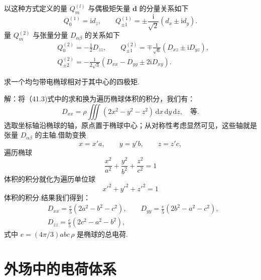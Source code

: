 以这种方式定义的量 $Q_m^{(l)}$ 与偶极矩矢量 $\boldsymbol{d}$ 的分量关系如下
\begin{equation}
  Q_0^{(1)}=\mathrm{i}d_z,\qquad
  Q_{\pm1}^{(1)}=\pm\frac{\mathrm{i}}{\sqrt{2}}(d_x\pm\mathrm{i}d_y).
\end{equation}
量 $Q_m^{(2)}$ 与张量分量 $D_{\alpha\beta}$ 的关系如下
\begin{equation}
\begin{aligned}
  &Q_0^{(2)}=-\frac{1}{2}D_{zz},\qquad
  Q_{\pm1}^{(2)}=\mp\frac{1}{\sqrt{6}}(D_{xz}\pm\mathrm{i}D_{yz}),\\
  &Q_{\pm2}^{(2)}=-\frac{1}{2\sqrt{3}}(D_{xx}-D_{yy}\pm2\mathrm{i}D_{xy}).
\end{aligned}
\end{equation}

\begin{xiti}

\quad 求一个均匀带电椭球相对于其中心的四极矩.

解：将（41.3)式中的求和换为遍历椭球体积的积分，我们有：
\begin{equation*}
  D_{xx}=\rho\iiint(2x^2-y^2-z^2)\,\mathrm{d}x\,\mathrm{d}y\,\mathrm{d}z,\quad\text{等}.
\end{equation*}
选取坐标轴沿椭球的轴，原点置于椭球中心；从对称性考虑显然可见，这些轴就是张量 $D_{\alpha\beta}$ 的主轴.借助变换
\begin{equation*}
  x=x'a,\qquad y=y'b,\qquad z=z'c,
\end{equation*}
遍历椭球
\begin{equation*}
  \frac{x^2}{a^2}+\frac{y^2}{b^2}+\frac{z^2}{c^2}=1
\end{equation*}
体积的积分就化为遍历单位球
\begin{equation*}
  x'^2+y'^2+z'^2=1
\end{equation*}
体积的积分.结果我们得到：
\begin{equation*}
\begin{aligned}
  &D_{xx}=\frac{e}{5}(2a^2-b^2-c^2),\qquad
  D_{yy}=\frac{e}{5}(2b^2-a^2-c^2),\\
  &D_{zz}=\frac{e}{5}(2c^2-a^2-b^2),
\end{aligned}
\end{equation*}
式中 $e=(4\pi/3)abc\,\rho$ 是椭球的总电荷.

\end{xiti}

\section{外场中的电荷体系}

